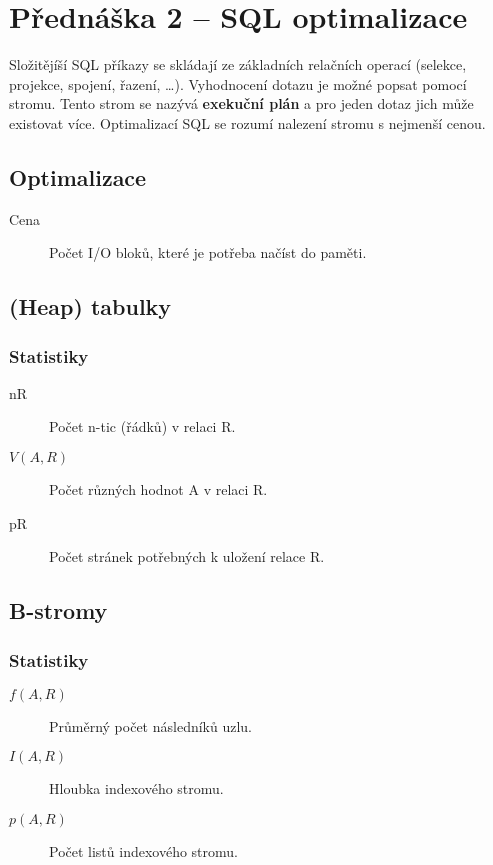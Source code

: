 \section{Přednáška 2 -- SQL optimalizace}

Složitějíší SQL příkazy se skládají ze základních relačních operací (selekce, projekce, spojení, řazení, \dots).
Vyhodnocení dotazu je možné popsat pomocí stromu.
Tento strom se nazývá \textbf{exekuční plán} a pro jeden dotaz jich může existovat více.
Optimalizací SQL se rozumí nalezení stromu s nejmenší cenou.

\subsection*{Optimalizace}

\begin{description}
    \item[Cena] Počet I/O bloků, které je potřeba načíst do paměti.
\end{description}

\subsection*{(Heap) tabulky}

\subsubsection*{Statistiky}

\begin{description}
    \item[nR] Počet n-tic (řádků) v relaci R.
    \item[\(V(A, R)\)] Počet různých hodnot A v relaci R.
    \item[pR] Počet stránek potřebných k uložení relace R.
\end{description}

\subsection*{B-stromy}

\subsubsection*{Statistiky}

\begin{description}
    \item[\(f(A, R)\)] Průměrný počet následníků uzlu.
    \item[\(I(A, R)\)] Hloubka indexového stromu.
    \item[\(p(A, R)\)] Počet listů indexového stromu.
\end{description}
